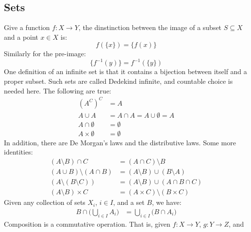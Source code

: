         \subsection{Sets}
            Give a function $f:X\rightarrow{Y}$, the dinstinction
            between the image of a subset $S\subseteq{X}$ and a
            point $x\in{X}$ is:
            \begin{equation}
                f(\{x\})=\{f(x)\}
            \end{equation}
            Similarly for the pre-image:
            \begin{equation}
                \{f^{\minus{1}}(y)\}=f^{\minus{1}}(\{y\})
            \end{equation}
            One definition of an infinite set is that it contains
            a bijection between itself and a proper subset. Such
            sets are called Dedekind infinite, and countable choice is
            needed here. The following are true:
            \begin{align}
                (A^{C})^{C}&=A\\
                A\cup{A}&=A\cap{A}=A\cup\emptyset=A\\
                A\cap\emptyset&=\emptyset\\
                A\times\emptyset&=\emptyset
            \end{align}
            In addition, there are De Morgan's laws and the distributive
            laws. Some more identities:
            \begin{align}
                (A\setminus{B})\cap{C}&=(A\cap{C})\setminus{B}\\
                (A\cup{B})\setminus(A\cap{B})
                    &=(A\setminus{B})\cup(B\setminus{A})\\
                (A\setminus(B\setminus{C}))
                    &=(A\setminus{B})\cup(A\cap{B}\cap{C})\\
                (A\setminus{B})\times{C}
                    &=(A\times{C})\setminus(B\times{C})
            \end{align}
            Given any collection of sets $X_{i}$, $i\in{I}$, and a
            set $B$, we have:
            \begin{align}
                B\cap\Big(\bigcup_{i\in{I}}A_{i}\Big)
                    &=\bigcup_{i\in{I}}\Big(B\cap{A_{i}}\Big)
            \end{align}
            Composition is a commutative operation. That is, given
            $f:X\rightarrow{Y}$, $g:Y\rightarrow{Z}$, and
